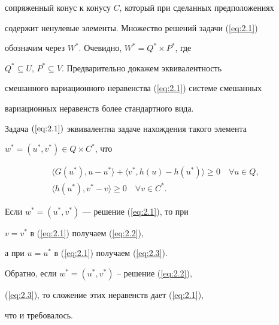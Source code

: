 сопряженный конус к конусу $C$, который при сделанных предположениях


содержит ненулевые элементы. Множество решений задачи (\ref{eq:2.1})


обозначим через $W^*$. Очевидно, $W^*=Q^* \times P^*$, где


$Q^*\subseteq U$, $P^*\subseteq V$. Предварительно докажем эквивалентность 


смешанного вариационного неравенства (\ref{eq:2.1}) системе смешанных 


вариационных неравенств более стандартного вида.





\begin{lem} \label{lm:2.1}


Задача $(\ref{eq:2.1})$ эквивалентна задаче нахождения такого элемента


$w^*=(u^*, v^*) \in Q \times C^*$, что


\begin{gather} \label{eq:2.2} 


\langle G(u^*), u-u^* \rangle+\langle v^*,


h(u)-h(u^*) \rangle \geq 0 \quad \forall u \in Q, \\


%


\label{eq:2.3} 


\langle h(u^*), v^* - v \rangle \geq 0 \quad \forall v \in C^*. 


\end{gather}


\end{lem}





\begin{pf}


Если $w^*=(u^*, v^*)$ --- решение (\ref{eq:2.1}), то при 


$v=v^*$ в (\ref{eq:2.1}) получаем (\ref{eq:2.2}),


а при $u=u^*$ в (\ref{eq:2.1}) получаем (\ref{eq:2.3}).


Обратно, если $w^*=(u^*, v^*)$ -- решение (\ref{eq:2.2}),


(\ref{eq:2.3}), то сложение этих неравенств дает (\ref{eq:2.1}),


что и требовалось.


\end{pf}






